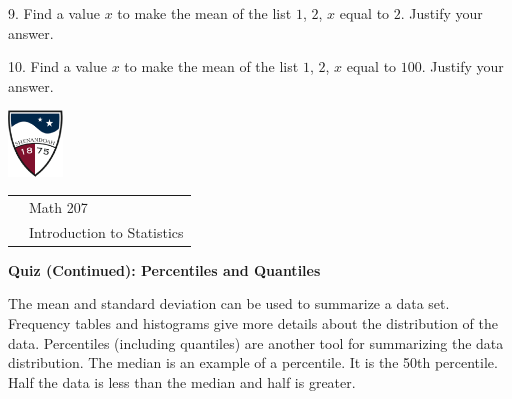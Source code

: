 \documentclass[10pt]{article}
\begin{document}
9. Find a value $x$ to make the mean of the list $1$, $2$, $x$ equal to $2$.  Justify your answer.
\vspace{0.9in}

10. Find a value $x$ to make the mean of the list $1$, $2$, $x$ equal to $100$.  Justify your answer.
\vfill
\eject


\href{http://www.su.edu}{\includegraphics[height=1.75cm]{sulogo.eps}}
\vspace{-1.69cm}

{\small \hfill
\begin{tabular}{cl}
& Math 207\\& Introduction to Statistics\\
\end{tabular}
}
\setlength{\baselineskip}{1.05\baselineskip}
\medskip
\medskip

\begin{center}
\textbf{\large  Quiz (Continued): Percentiles and Quantiles}
\end{center}

The mean and standard deviation can be used to summarize a data set.  
Frequency tables and histograms give more details about the distribution
of the data.  Percentiles (including quantiles) are another tool for 
summarizing the data distribution.
The median is an example of a percentile.  It is the 50th percentile.  Half
the data is less than the median and half is greater.
\newcommand{\HS}{\hspace{20pt}}
\end{document}
